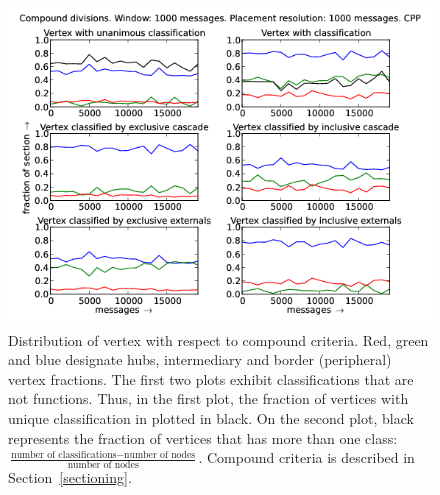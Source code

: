 \documentclass[%
 aip,
 jmp,%
 amsmath,amssymb,
 reprint,%
]{revtex4-1}
\begin{document}
\begin{figure}[hbtp] 
   \centering
        \includegraphics[width=\textwidth]{figs/CPP/1000_2}
    \caption{Distribution of vertex with respect to compound criteria. Red, green and blue designate hubs, intermediary and border (peripheral) vertex fractions. The first two plots exhibit classifications that are not functions. Thus, in the first plot, the fraction of vertices with unique classification in plotted in black. On the second plot, black represents the fraction of vertices that has more than one class: $\frac{\text{number of classifications} - \text{number of nodes}}{\text{number of nodes}}$. Compound criteria is described in Section~\ref{sectioning}.}
    \label{fig:cpp1000_}
\end{figure}
\end{document}
